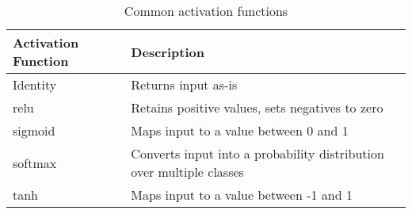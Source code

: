 \begin{table}[ht]
    \centering
    \begin{tabular}{p{4cm}|p{8cm}}
        \textbf{Activation Function} &  \textbf{Description} \\ \hline
        Identity &  Returns input as-is \\
        \gls{relu} & Retains positive values, sets negatives to zero \\
        \gls{sigmoid} & Maps input to a value between 0 and 1 \\
        \gls{softmax} & Converts input into a probability distribution over multiple classes \\
        \gls{tanh} & Maps input to a value between -1 and 1 \\
    \end{tabular}
    \caption{Common activation functions}
    \label{tab:02_nn_common_activation_functions}
\end{table}
